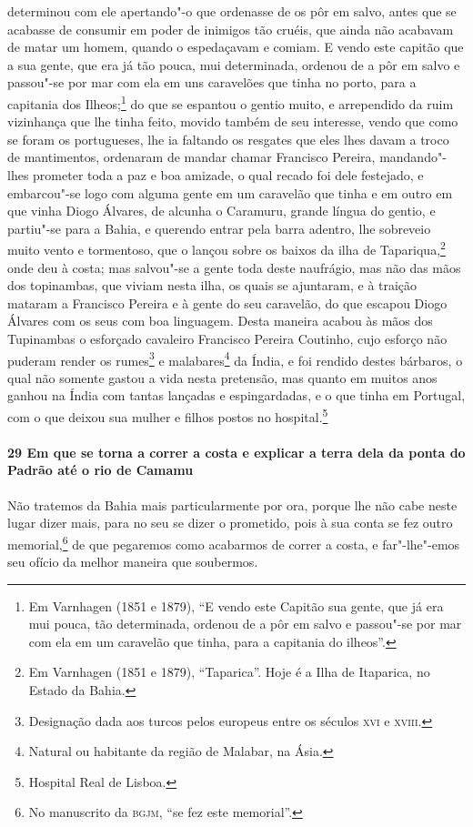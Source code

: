 \begin{linenumbers}
determinou com ele apertando"-o que ordenasse de os pôr em salvo, antes que se acabasse de
consumir em poder de inimigos tão cruéis, que ainda não acabavam de matar um homem, quando
o espedaçavam e comiam. E vendo este capitão que a sua gente, que era já tão pouca, mui
determinada, ordenou de a pôr em salvo e passou"-se por mar com ela em uns caravelões que
tinha no porto, para a capitania dos Ilheos;\footnote{ Em Varnhagen (1851 e 1879), ``E
vendo este Capitão sua gente, que já era mui pouca, tão determinada, ordenou de a pôr em
salvo e passou"-se por mar com ela em um caravelão que tinha, para a capitania do
ilheos''.} do que se espantou o gentio muito, e arrependido da ruim vizinhança que lhe
tinha feito, movido também de seu interesse, vendo que como se foram os portugueses, lhe
ia faltando os resgates que eles lhes davam a troco de mantimentos, ordenaram de mandar
chamar Francisco Pereira, mandando"-lhes prometer toda a paz e boa amizade, o qual recado
foi dele festejado, e embarcou"-se logo com alguma gente em um caravelão que tinha e em
outro em que vinha Diogo Álvares, de alcunha o Caramuru, grande língua do gentio, e
partiu"-se para a Bahia, e querendo entrar pela barra adentro, lhe sobreveio muito vento e
tormentoso, que o lançou sobre os baixos da ilha de Tapariqua,\footnote{ Em Varnhagen (1851
e 1879), ``Taparica''. Hoje é a Ilha de Itaparica, no Estado da Bahia.} onde deu à costa;
mas salvou"-se a gente toda deste naufrágio, mas não das mãos dos topinambas, que viviam
nesta ilha, os quais se ajuntaram, e à traição mataram a Francisco Pereira e à gente do
seu caravelão, do que escapou Diogo Álvares com os seus com boa linguagem. Desta maneira
acabou às mãos dos Tupinambas o esforçado cavaleiro Francisco Pereira Coutinho, cujo
esforço não puderam render os rumes\footnote{ Designação dada aos turcos pelos europeus
entre os séculos \textsc{xvi} e \textsc{xviii}.} e malabares\footnote{ Natural ou
habitante da região de Malabar, na Ásia.} da Índia, e foi rendido destes bárbaros, o qual
não somente gastou a vida nesta pretensão, mas quanto em muitos anos ganhou na Índia com
tantas lançadas e espingardadas, e o que tinha em Portugal, com o que deixou sua mulher e
filhos postos no hospital.\footnote{ Hospital Real de Lisboa.}

\paragraph{29 Em que se torna a correr a costa e explicar a terra dela da ponta do Padrão
até o rio de Camamu} \quad
Não tratemos da Bahia mais particularmente por ora, porque lhe não cabe neste lugar dizer
mais, para no seu se dizer o prometido, pois à sua conta se fez outro memorial,\footnote{
No manuscrito da \textsc{bgjm}, ``se fez este memorial''.} de que pegaremos como acabarmos
de correr a costa, e far"-lhe"-emos seu ofício da melhor maneira que soubermos.


\end{linenumbers}
